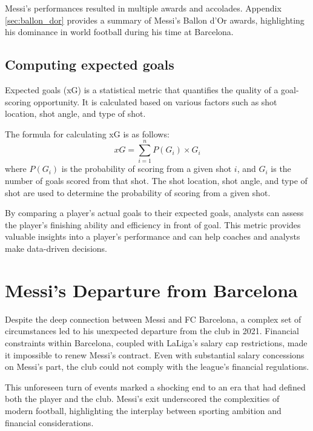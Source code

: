 Messi's performances resulted in multiple awards and accolades.
Appendix \ref{sec:ballon_dor} provides a summary of Messi's Ballon 
d'Or awards, highlighting his dominance in world football during his time 
at Barcelona.

\subsection{Computing expected goals}

Expected goals (xG) is a statistical metric that quantifies the quality of a
goal-scoring opportunity.
It is calculated based on various factors such as shot location, shot angle,
and type of shot.

The formula for calculating xG is as follows:
\begin{equation}
    xG = \sum_{i=1}^{n} P(G_i) \times G_i
\end{equation}
where $P(G_i)$ is the probability of scoring from a given shot $i$, and 
$G_i$ is the number of goals scored from that shot.
The shot location, shot angle, and type of shot are used to determine the
probability of scoring from a given shot.

By comparing a player's actual goals to their expected goals, analysts can
assess the player's finishing ability and efficiency in front of goal.
This metric provides valuable insights into a player's performance and can
help coaches and analysts make data-driven decisions.

\section{Messi's Departure from Barcelona}\label{sec:messi_departure}

Despite the deep connection between Messi and FC Barcelona, a complex 
set of circumstances led to his unexpected departure from the club in 2021.
Financial constraints within Barcelona, coupled with LaLiga's salary cap 
restrictions, made it impossible to renew Messi's contract.
Even with substantial salary concessions on Messi's part, the club could 
not comply with the league's financial regulations. 

This unforeseen turn of events marked a shocking end to an era that had 
defined both the player and the club.
Messi's exit underscored the complexities of modern football, 
highlighting the interplay between sporting ambition and financial 
considerations.

